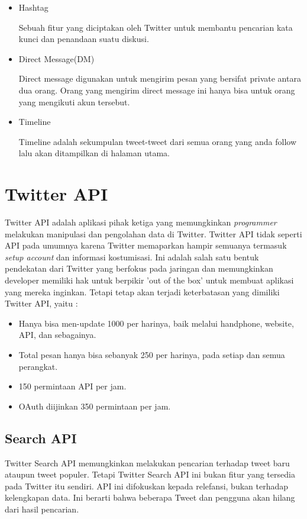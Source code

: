 \begin{itemize}
	\item Hashtag
	
	Sebuah fitur yang diciptakan oleh Twitter untuk membantu pencarian kata kunci dan penandaan suatu diskusi.
	
	\item Direct Message(DM)
	
	Direct message digunakan untuk mengirim pesan yang bersifat private antara dua orang. Orang yang mengirim direct message ini hanya bisa untuk orang yang mengikuti akun tersebut.
	\item Timeline
	
	Timeline adalah sekumpulan tweet-tweet dari semua orang yang anda follow lalu akan ditampilkan di halaman utama.
\end{itemize}


\section{Twitter API}
Twitter API adalah aplikasi pihak ketiga yang memungkinkan \textit{programmer} melakukan manipulasi dan pengolahan data di Twitter. Twitter API tidak seperti API pada umumnya karena Twitter memaparkan hampir semuanya termasuk \textit{setup account} dan informasi kostumisasi\cite{Twitter}. Ini adalah salah satu bentuk pendekatan dari Twitter yang berfokus pada jaringan dan memungkinkan developer memiliki hak untuk berpikir 'out of the box' untuk membuat aplikasi yang mereka inginkan. Tetapi tetap akan terjadi keterbatasan yang dimiliki Twitter API, yaitu :
\begin{itemize}
	\item Hanya bisa men-update 1000 per harinya, baik melalui handphone, website, API, dan sebagainya.
	\item Total pesan hanya bisa sebanyak 250 per harinya, pada setiap dan semua perangkat.
	\item 150 permintaan API per jam.
	\item OAuth diijinkan 350 permintaan per jam.
\end{itemize}

\subsection{Search API}

Twitter Search API memungkinkan melakukan pencarian terhadap tweet baru ataupun tweet populer. Tetapi Twitter Search API ini bukan fitur yang tersedia pada Twitter itu sendiri. API ini difokuskan kepada relefansi, bukan terhadap kelengkapan data. Ini berarti bahwa beberapa Tweet dan pengguna akan hilang dari hasil pencarian.

